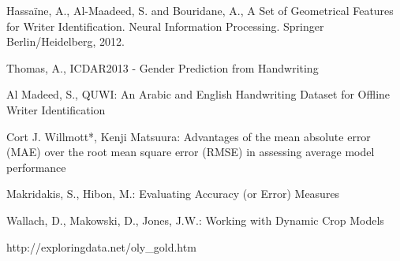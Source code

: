 \documentclass[11pt]{article}
\begin{document}
\begin{thebibliography}{7}

 Hassaïne, A., Al-Maadeed, S. and Bouridane, A., A Set of Geometrical Features for Writer Identification. Neural Information Processing. Springer Berlin/Heidelberg, 2012.

 Thomas, A., ICDAR2013 - Gender Prediction from Handwriting

 Al Madeed, S., QUWI: An Arabic and English Handwriting Dataset for Offline Writer Identification

 Cort J. Willmott*, Kenji Matsuura: Advantages of the mean absolute error (MAE) over the root mean square error (RMSE) in assessing average model performance

 Makridakis, S., Hibon, M.: Evaluating Accuracy (or Error) Measures

 Wallach, D., Makowski, D., Jones, J.W.: Working with Dynamic Crop Models

 http://exploringdata.net/oly\_gold.htm


\end{thebibliography}
\end{document}

